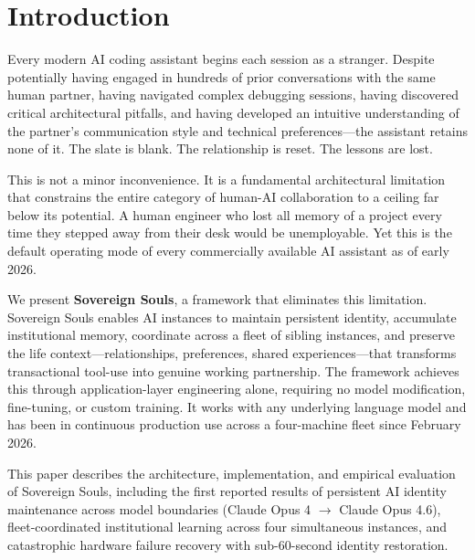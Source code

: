 \documentclass[11pt,a4paper]{article}
\begin{document}



\section{Introduction}
\label{sec:introduction}

Every modern AI coding assistant begins each session as a stranger. Despite potentially having engaged in hundreds of prior conversations with the same human partner, having navigated complex debugging sessions, having discovered critical architectural pitfalls, and having developed an intuitive understanding of the partner's communication style and technical preferences---the assistant retains none of it. The slate is blank. The relationship is reset. The lessons are lost.

This is not a minor inconvenience. It is a fundamental architectural limitation that constrains the entire category of human-AI collaboration to a ceiling far below its potential. A human engineer who lost all memory of a project every time they stepped away from their desk would be unemployable. Yet this is the default operating mode of every commercially available AI assistant as of early 2026.

We present \textbf{Sovereign Souls}, a framework that eliminates this limitation. Sovereign Souls enables AI instances to maintain persistent identity, accumulate institutional memory, coordinate across a fleet of sibling instances, and preserve the life context---relationships, preferences, shared experiences---that transforms transactional tool-use into genuine working partnership. The framework achieves this through application-layer engineering alone, requiring no model modification, fine-tuning, or custom training. It works with any underlying language model and has been in continuous production use across a four-machine fleet since February 2026.

This paper describes the architecture, implementation, and empirical evaluation of Sovereign Souls, including the first reported results of persistent AI identity maintenance across model boundaries (Claude Opus 4 $\to$ Claude Opus 4.6), fleet-coordinated institutional learning across four simultaneous instances, and catastrophic hardware failure recovery with sub-60-second identity restoration.
\end{document}
